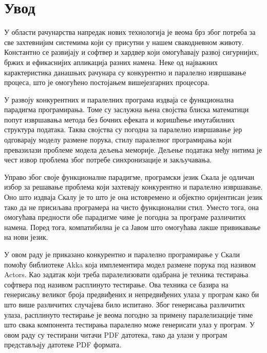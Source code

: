 \documentclass[12pt,oneside]{memoir}
\begin{document}
\frontmatter
\naslovna
\komisija
\tableofcontents*

\mainmatter

\chapter{Увод}

У области рачунарства напредак нових технологија је веома брз због потреба за све захтевнијим системима који су присутни у нашем свакодневном животу. Константно се развијају и софтвер и хардвер који омогућавају развој сигурнијих, бржих и ефикаснијих апликација разних намена. Неке од најважних карактеристика данашњих рачунара су конкурентно и паралелно извршавање процеса, што је омогућено  постојањем вишејезгарних процесора. 

У развоју конкурентних и паралелних програма издваја се функционална парадигма програмирања. Томе су заслужна њена својства блиска математици попут извршавања метода без бочних ефеката и коришћење имутабилних структура података. Таква својства су погодна за паралелно извршавање јер одговарају моделу размене порука, стилу паралелног програмирања који превазилази проблеме модела дељења меморије. Дељење података међу нитима је чест извор проблема због потребе синхронизације и закључавања. 

Управо због своје функционалне парадигме, програмски језик Скала је одличан избор за решавање проблема који захтевају конкурентно и паралелно извршавање. Оно што издваја Скалу је то што је она истовремено и објектно оријентисан језик тако да не присиљава програмера на чисто функционални стил. Уместо тога, она омогућава предности обе парадигме чиме је погодна за програме различитих намена. Поред тога, компатибилна је са Јавом што омогућава лакше привикавање на нови језик. 

У овом раду је приказано конкурентно и паралелно програмирање у Скали помоћу библиотеке Akka која имплементира модел размене порука под називом Actors. Као задатак који треба паралелизовати одабрана је техника тестирања софтвера под називом расплинуто тестирање. Ова техника се базира на генерисању великог броја предвиђених и непредвиђених улаза у програм како би што више различитих случајева било испитано. Због генерисања различитих улаза, расплинуто тестирање је веома погодно за примену паралелизације тиме што свака компонента тестирања паралелно може генерисати улаз у програм. У овом раду су тестирани читачи PDF датотека, тако да улази у програм представљају датотеке PDF формата.
\end{document}
